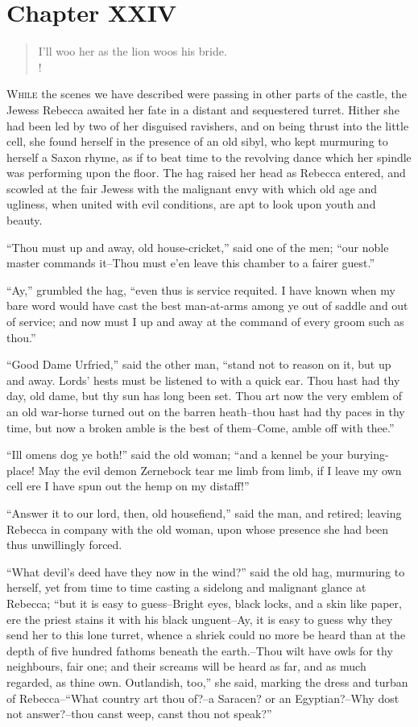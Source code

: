 \chapter{Chapter XXIV}

\begin{verse}
I'll woo her as the lion woos his bride.\\!
\end{verse}

\lettrine{W}{hile} the scenes we have described were passing in other
parts of the
castle, the Jewess Rebecca awaited her fate in a distant and sequestered
turret. Hither she had been led by two of her disguised ravishers, and
on being thrust into the little cell, she found herself in the presence
of an old sibyl, who kept murmuring to herself a Saxon rhyme, as if to
beat time to the revolving dance which her spindle was performing upon
the floor. The hag raised her head as Rebecca entered, and scowled at
the fair Jewess with the malignant envy with which old age and ugliness,
when united with evil conditions, are apt to look upon youth and beauty.

``Thou must up and away, old house-cricket,'' said one of the men; ``our
noble master commands it--Thou must e'en leave this chamber to a fairer
guest.''

``Ay,'' grumbled the hag, ``even thus is service requited. I have known
when my bare word would have cast the best man-at-arms among ye out of
saddle and out of service; and now must I up and away at the command of
every groom such as thou.''

``Good Dame Urfried,'' said the other man, ``stand not to reason on it,
but up and away. Lords' hests must be listened to with a quick ear. Thou
hast had thy day, old dame, but thy sun has long been set. Thou art now
the very emblem of an old war-horse turned out on the barren heath--thou
hast had thy paces in thy time, but now a broken amble is the best of
them--Come, amble off with thee.''

``Ill omens dog ye both!'' said the old woman; ``and a kennel be your
burying-place! May the evil demon Zernebock tear me limb from limb, if I
leave my own cell ere I have spun out the hemp on my distaff!''

``Answer it to our lord, then, old housefiend,'' said the man, and
retired; leaving Rebecca in company with the old woman, upon whose
presence she had been thus unwillingly forced.

``What devil's deed have they now in the wind?'' said the old hag,
murmuring to herself, yet from time to time casting a sidelong and
malignant glance at Rebecca; ``but it is easy to guess--Bright eyes,
black locks, and a skin like paper, ere the priest stains it with his
black unguent--Ay, it is easy to guess why they send her to this lone
turret, whence a shriek could no more be heard than at the depth of five
hundred fathoms beneath the earth.--Thou wilt have owls for thy
neighbours, fair one; and their screams will be heard as far, and as
much regarded, as thine own. Outlandish, too,'' she said, marking the
dress and turban of Rebecca--``What country art thou of?--a Saracen? or
an Egyptian?--Why dost not answer?--thou canst weep, canst thou not
speak?''

